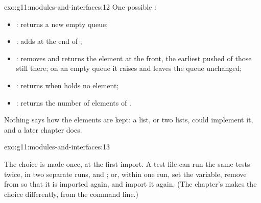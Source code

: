 \begin{solution}{exo:g11:modules-and-interfaces:12}
One possible :
\begin{itemize}
  \item {}: returns a new empty queue;
  \item {}: adds  at the end of ;
  \item {}: removes and returns the element at the front, the earliest pushed of those still there; on an
    empty queue it raises  and leaves the queue unchanged;
  \item {}: returns  when  holds no element;
  \item {}: returns the number of elements of .
\end{itemize}
Nothing says how the elements are kept: a list, or two lists, could implement it, and a later chapter does.
\end{solution}

\begin{solution}{exo:g11:modules-and-interfaces:13}
\smallskip\noindent\hspace*{2em}

\noindent\hspace*{2em}

\noindent\hspace*{4em}

\noindent\hspace*{2em}

\noindent\hspace*{4em}

\smallskip\noindent The choice is made once, at the first import. A test file can run the same tests twice, in two
separate runs,  and ; or, within one run, set
the variable, remove  from  so that it is imported again, and import it again.
(The chapter's  makes the choice differently, from the command line.)
\end{solution}

